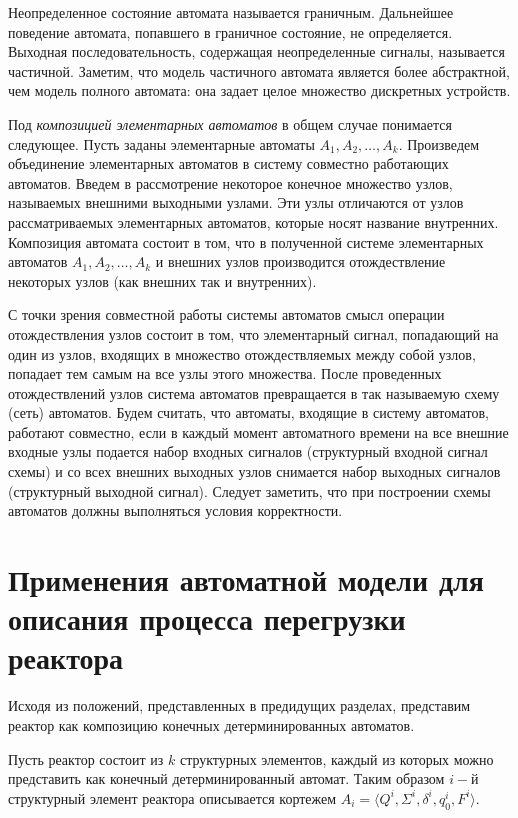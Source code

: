 Неопределенное состояние автомата называется граничным. 
Дальнейшее поведение автомата, попавшего в граничное состояние, не определяется. 
Выходная последовательность, содержащая неопределенные сигналы, называется частичной.
Заметим, что модель частичного автомата является более абстрактной, чем модель полного автомата: она задает целое множество дискретных устройств. \cite{TA-Syntes}

Под \textit{композицией элементарных автоматов} в общем случае понимается следующее.
Пусть заданы элементарные автоматы $A_1, A_2, \dots, A_k$.
Произведем объединение элементарных автоматов в систему совместно работающих автоматов. 
Введем в рассмотрение некоторое конечное множество узлов, называемых внешними выходными узлами. 
Эти узлы отличаются от узлов рассматриваемых элементарных автоматов, которые носят название внутренних.
Композиция автомата состоит в том, что в полученной системе элементарных автоматов $A_1, A_2, \dots, A_k$ и внешних узлов производится отождествление некоторых узлов (как внешних так и внутренних). 

С точки зрения совместной работы системы автоматов смысл операции отождествления узлов состоит в том, что элементарный сигнал, попадающий на один из узлов, входящих в множество отождествляемых между собой узлов, попадает тем самым на все узлы этого множества. 
После проведенных отождествлений узлов система автоматов превращается в так называемую схему (сеть) автоматов.
Будем считать, что автоматы, входящие в систему автоматов, работают совместно, если в каждый момент автоматного времени на все внешние входные узлы подается набор входных сигналов (структурный входной сигнал схемы) и со всех внешних выходных узлов снимается набор выходных сигналов (структурный выходной сигнал). 
Следует заметить, что при построении схемы автоматов должны выполняться условия корректности. 
\cite{TA-Lupal}

\section{Применения автоматной модели для описания процесса перегрузки реактора}

Исходя из положений, представленных в предидущих разделах, представим реактор как композицию конечных детерминированных автоматов.

Пусть реактор состоит из $k$ структурных элементов, каждый из которых можно представить как конечный детерминированный автомат.
Таким образом $i-$й структурный элемент реактора описывается кортежем $A_i = \langle Q^i, \Sigma^i, \delta^i, q_0^i, F^i  \rangle$. 

